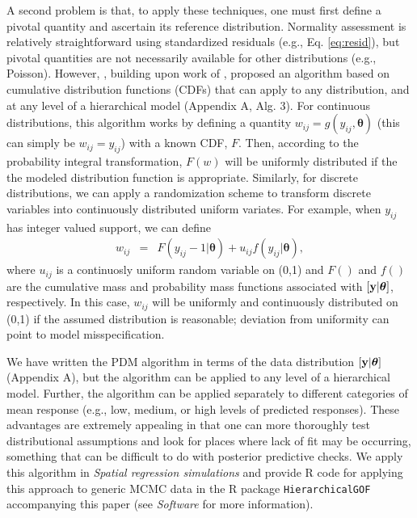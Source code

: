\documentclass[12pt,english]{article}
\begin{document}
\begin{spacing}{1.9}
A second problem is that, to apply these techniques, one must first
define a pivotal quantity and ascertain its reference
distribution. Normality assessment is relatively straightforward using
standardized residuals (e.g., Eq. \ref{eq:resid}), but pivotal
quantities are not necessarily available for other distributions
(e.g., Poisson).  However, \citet{YuanJohnson2012}, building upon work
of \citet{Johnson2004}, proposed an algorithm based on cumulative
distribution functions (CDFs) that can apply to any distribution, and
at any level of a hierarchical model (Appendix A, Alg. 3).  For
continuous distributions, this algorithm works by defining a quantity
$w_{ij} = g(y_{ij},\boldsymbol{\theta})$ (this can simply be
$w_{ij}=y_{ij}$) with a known CDF, $F$.  Then, according to the
probability integral transformation, $F(w)$ will be uniformly
distributed if the the modeled distribution function is appropriate.
Similarly, for discrete distributions, we can apply a randomization
scheme \citep{Smith1985,YuanJohnson2012} to transform discrete
variables into continuously distributed uniform variates.  For
example, when $y_{ij}$ has integer valued support, we can define
\begin{eqnarray*}
  w_{ij} & = & F(y_{ij}-1|\boldsymbol{\theta}) + u_{ij} f(y_{ij}|\boldsymbol{\theta}),
\end{eqnarray*}
where $u_{ij}$ is a continuosly uniform random variable on (0,1) and
$F()$ and $f()$ are the cumulative mass and probability mass functions
associated with $[{\bf y} | \boldsymbol{\theta}]$, respectively.  In
this case, $w_{ij}$ will be uniformly and continuously distributed on
(0,1) if the assumed distribution is reasonable; deviation from
uniformity can point to model misspecification.

We have written the PDM algorithm in terms of the data distribution
$[{\bf y} | \boldsymbol{\theta}]$ (Appendix A), but the algorithm can
be applied to any level of a hierarchical model. Further, the
algorithm can be applied separately to different categories of mean
response (e.g., low, medium, or high levels of predicted
responses). These advantages are extremely appealing in that one can
more thoroughly test distributional assumptions and look for places
where lack of fit may be occurring, something that can be difficult to
do with posterior predictive checks.  We apply this algorithm in
\textit{Spatial regression simulations} and provide R code for
applying this approach to generic MCMC data in the R package
\texttt{HierarchicalGOF} accompanying this paper (see
\textit{Software} for more information).




\end{spacing}
\end{document}
